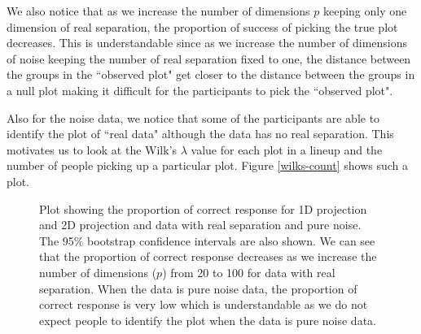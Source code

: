 \documentclass[12]{article}
\begin{document}
We also notice that as we increase the number of dimensions $p$ keeping only one dimension of real separation, the proportion of success of picking the true plot decreases. This is understandable since as we increase the number of dimensions of noise keeping the number of real separation fixed to one, the distance between the groups in the ``observed plot"  get closer to the distance between the groups in a null plot making it difficult for the participants to pick the ``observed plot". 

Also for the noise data, we notice that some of the participants are able to identify the plot of ``real data"  although the data has no real separation. This motivates us to look at the Wilk's $\lambda$ value for each plot in a lineup and the number of people picking up a particular plot. Figure \ref{wilks-count} shows such a plot. 


\begin{figure}[hbtp]
   \centering
      \caption{Plot showing the proportion of correct response for 1D projection and 2D projection and data with real separation and pure noise. The 95\% bootstrap confidence intervals are also shown. We can see that the proportion of correct response decreases as we increase the number of dimensions ($p$) from 20 to 100 for data with real separation. When the data is pure noise data, the proportion of correct response is very low which is understandable as we do not expect people to identify the plot when the data is pure noise data.  }
       \label{real_noise}
\end{figure}
\end{document}
